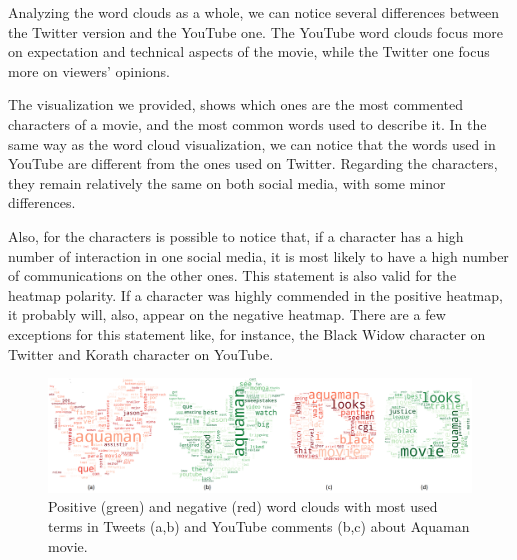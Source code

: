 Analyzing the word clouds as a whole, we can notice several differences between the Twitter version and the YouTube one. The YouTube word clouds focus more on expectation and technical aspects of the movie, while the Twitter one focus more on viewers' opinions.

The visualization we provided, shows which ones are the most commented characters of a movie, and the most common words used to describe it. In the same way as the word cloud visualization, we can notice that the words used in YouTube are different from the ones used on Twitter. Regarding the characters, they remain relatively the same on both social media, with some minor differences.

Also, for the characters is possible to notice that, if a character has a high number of interaction in one social media, it is most likely to have a high number of communications on the other ones. This statement is also valid for the heatmap polarity. If a character was highly commended in the positive heatmap, it probably will, also, appear on the negative heatmap. There are a few exceptions for this statement like, for instance, the Black Widow character on Twitter and Korath character on YouTube.

\begin{figure}[htb]
\begin{center}
    \includegraphics[width=1\linewidth]{img/wordcloudsAquaman.png}
\end{center}
  \caption{Positive (green) and negative (red) word clouds with most used terms in Tweets (a,b) and YouTube comments (b,c) about Aquaman movie.}
\label{fig:wordcloudsAquaman}
\end{figure}

